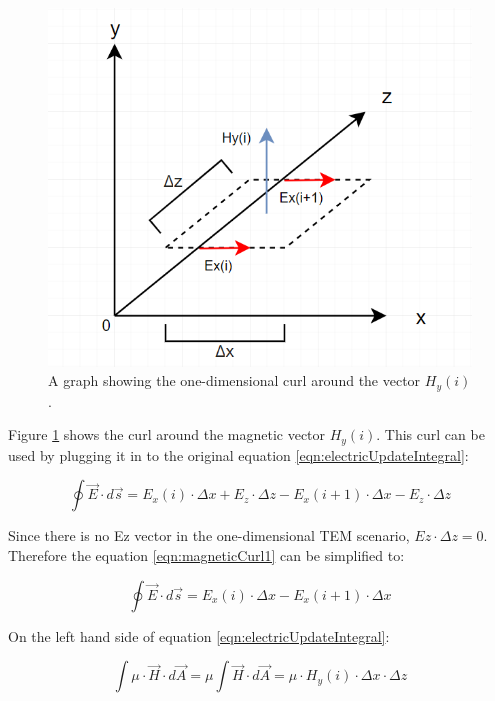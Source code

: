 \begin{figure}
	\centering
	\includegraphics[scale=0.7]{Figures/fdtd1dHcurl}
	\decoRule
	\caption[1D Curl around $H_y$]{A graph showing the one-dimensional curl around the vector $H_y(i)$.}
	\label{fig:fdtd1dHcurl}
\end{figure}

Figure \ref{fig:fdtd1dHcurl} shows the curl around the magnetic vector $H_y(i)$. This curl can be used by plugging it in to the original equation \ref{eqn:electricUpdateIntegral}:

\begin{equation}
	\label{eqn:magneticCurl1}
	\oint \vec{E} \cdot d\vec{s} = E_x(i) \cdot \Delta x + E_z \cdot \Delta z - E_x(i+1) \cdot \Delta x - E_z \cdot \Delta z
\end{equation}

Since there is no Ez vector in the one-dimensional TEM scenario, $Ez \cdot \Delta z = 0$. Therefore the equation \ref{eqn:magneticCurl1} can be simplified to:

\begin{equation}
	\label{eqn:magneticCurl2}
	\oint \vec{E} \cdot d\vec{s} = E_x(i) \cdot \Delta x - E_x(i+1) \cdot \Delta x
\end{equation}

On the left hand side of equation \ref{eqn:electricUpdateIntegral}:

\begin{equation}
	\label{eqn:magneticCurl3}
	\int \mu \cdot \vec{H} \cdot d\vec{A} = \mu \int \vec{H} \cdot d\vec{A} = \mu \cdot H_y(i) \cdot \Delta x \cdot \Delta z
\end{equation}

